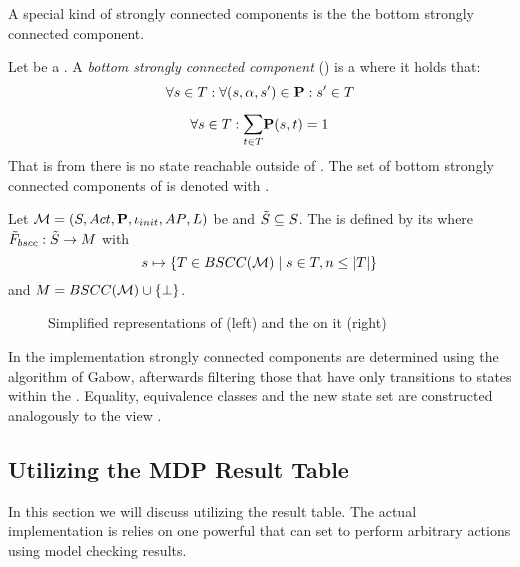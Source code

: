 \documentclass[preview]{standalone}
\begin{document}
A special kind of strongly connected components is the the bottom strongly connected component.

\begin{definition}
	Let \scc be a \sccN. A \emph{bottom strongly connected component} (\bsccN) is a \sccN where it holds that: 
	\[
	\forall {s} \in {T} : \forall ({s}, {\alpha}, {s}') \in {\ensuremath{{\textbf{P}}}} : {s}' \in {T}
	\]
	\[
	\forall \state \in \scc : \bigsum{t \in \scc} \trans(\state, t) = 1
	\]
	That is from \scc there is no state reachable outside of \scc. The set of bottom strongly connected components of \chgph is denoted with \setbscc.
\end{definition}


\begin{definition}
	Let ${{{\mathcal{M}}}} = {{({S}, {Act}, {\textbf{P}}, {\iota_{init}}, {AP}, {L})}}$ be \achgphN and ${\tilde{{S}}} \subseteq {S}$. The \viewN \viewbscc is defined by its \grpfctN where ${{\tilde{F}_{{bscc}}}} : {\tilde{{S}}} \to {\ensuremath{{M}}}$ with
	\[
	{s} \mapsto \{{T} \in {BSCC(\ensuremath{{{{\mathcal{M}}}}})} \mid {s} \in {T}, n \leq |{T}|\}
	\]
	and ${{M}} = {BSCC({{{\mathcal{M}}}})} \cup {\{\bot\}}$.
\end{definition}

\begin{figure}[h]
	\begin{minipage}{.55\textwidth}
		\hspace{5mm}
		
	\end{minipage}
	\begin{minipage}{.5\textwidth}		
		
	\end{minipage}
	\caption{Simplified representations of \mdp (left) and the \viewN \viewbscc on it (right)}
	\label{fig:bsccAfter}  
\end{figure}

In the implementation strongly connected components are determined using the algorithm of Gabow, afterwards filtering those \sccsN that have only transitions to states within the \sccN. Equality, equivalence classes and the new state set are constructed analogously to the view \viewscc.

\subsection{Utilizing the MDP Result Table}
In this section we will discuss \viewsN utilizing the result table. The actual implementation is relies on one powerful \viewN that can set to perform arbitrary actions using model checking results.


	
\end{document}
